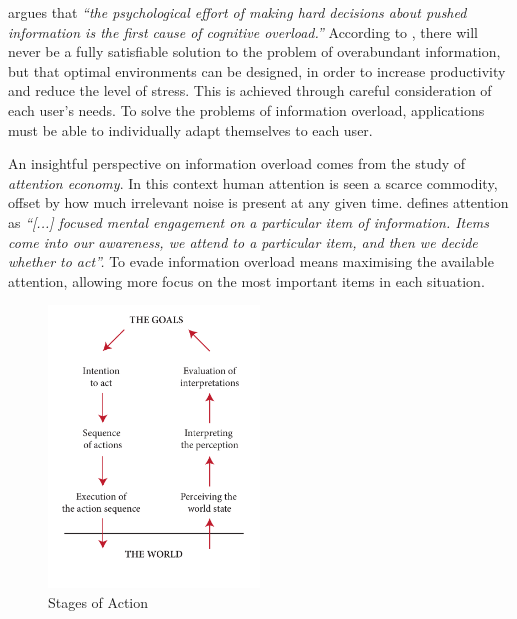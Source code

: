 \cite{Kirsh2000} argues that 
\emph{``the psychological effort of making hard decisions about \emph{pushed} information is the first cause of cognitive overload.''} 
According to \citeauthor{Kirsh2000}, there will never be a fully satisfiable solution to the problem of overabundant information, 
but that optimal environments can be designed,
in order to increase productivity and reduce the level of stress.
This is achieved through careful consideration of each user's needs. 
To solve the problems of information overload, 
applications must be able to individually adapt themselves to each user. 

An insightful perspective on information overload comes from the study of \emph{attention economy}. 
In this context human attention is seen a scarce commodity, offset by how much irrelevant noise is present at any given time. 
\citet[p1]{Davenport2001} defines attention as \emph{``[...] focused mental engagement on a particular item of information. 
Items come into our awareness, we attend to a particular item, and then we decide whether to act''.} 
To evade information overload means maximising the available attention, allowing more focus on the most important items in each situation.

\begin{figure}
  \vspace{-20pt}
  \begin{center}
    \includegraphics[width=0.5\textwidth]{../graphics/seven-stages.pdf}
    \vspace{-20pt}
    \caption[The Seven Stages of Action]{Stages of Action}
  \end{center}
  \label{fig:seven-stages}
  \vspace{-20pt}
\end{figure}

